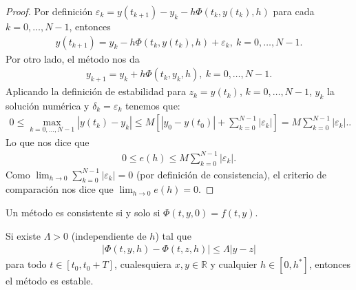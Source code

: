 \begin{proof}
Por definición $\varepsilon_k = y(t_{k+1}) - y_k - h \Phi(t_k,y(t_k),h)$ para cada $k = 0,\ldots,N-1$, entonces
\begin{align*}
    y(t_{k+1}) =  y_k - h \Phi(t_k,y(t_k),h) + \varepsilon_k, \ k = 0,\ldots,N-1.
\end{align*}
Por otro lado, el método nos da
\begin{align*}
    y_{k+1} = y_k + h\Phi(t_k,y_k,h), \ k = 0,\ldots,N-1.
\end{align*}
Aplicando la definición de estabilidad para $z_k = y(t_k)$, $k = 0,\ldots,N-1$, $y_k$ la solución numérica y $\delta_k = \varepsilon_k$ tenemos que:
\begin{align*}
    0 \leq \max_{k=0,\ldots,N-1} |y(t_k) - y_k| \leq M \left[ |y_0 - y(t_0)| + \sum_{k=0}^{N-1} |\varepsilon_k| \right]  = M\sum_{k=0}^{N-1} |\varepsilon_k| ..
\end{align*}
Lo que nos dice que
\begin{align*}
    0 \leq e(h) \leq M\sum_{k=0}^{N-1} |\varepsilon_k| .
\end{align*}
Como $\lim_{h \to 0} \sum_{k=0}^{N-1} |\varepsilon_k| = 0$ (por definición de consistencia), el criterio de comparación nos dice que $\lim_{h \to 0} e(h) = 0$.
\end{proof}

\begin{teo}
Un método es consistente si y solo si $\Phi(t,y,0) = f(t,y)$.
\end{teo}

\begin{teo}
Si existe $\Lambda > 0$ (independiente de $h$) tal que
\begin{align*}
    |\Phi(t,y,h) - \Phi(t,z,h)| \leq \Lambda|y-z|
\end{align*}
para todo $t \in [t_0,t_0+T]$, cualesquiera $x,y \in \mathbb{R}$ y cualquier $h \in [0,h^*]$, entonces el método es estable.
\end{teo}

